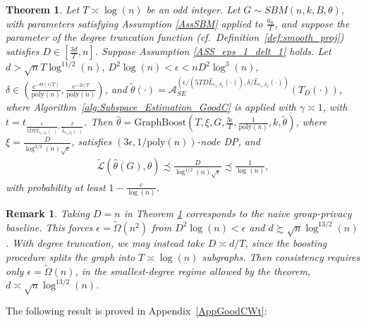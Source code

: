\documentclass{article}
\newtheorem{remark}{Remark}
\newtheorem{theorem}{Theorem}
\newcommand{\thetahat}{\ensuremath{\widehat{\theta}}}
\begin{document}
\begin{theorem}
\label{theorem:GoodCent_Main_Thm}
Let $T \asymp \log(n)$ be an odd integer. Let $G \sim SBM(n, k, B, \theta)$, with parameters satisfying Assumption \ref{AssSBM} applied to $\frac{a_n}{T}$, and suppose the parameter of the degree truncation function (cf.\ Definition~\ref{def:smooth_proj}) satisfies $D \in \left[\frac{3d}{T}, n\right]$. Suppose Assumption \ref{ASS_eps_1_delt_1} holds. Let $d > \sqrt{n}T\log^{11/2}(n)$, $D^2\log(n) < \epsilon < nD^2\log^3(n)$, $\delta \in \left(\frac{e^{-\Theta(\epsilon/T)}}{\mathrm{poly}(n)}, \frac{e^{-2\epsilon/T}}{\mathrm{poly}(n)}\right)$, and $\widetilde{\theta}(\cdot) = \mathcal{A}_{SE}^{\left(\epsilon/(5TD\hat{L}_{\epsilon_1, \delta_1}(\cdot)), \delta/\hat{L}_{\epsilon_1, \delta_1}(\cdot)\right)}(T_{D}(\cdot))$, where Algorithm~\ref{alg:Subspace_Estimation_GoodC} is applied with $\gamma \asymp 1$, with $t = t_{\frac{\epsilon}{5DT\hat{L}_{\epsilon_1, \delta_1}(\cdot)}, \frac{\delta}{\hat{L}_{\epsilon_1, \delta_1}(\cdot)}}$. Then $\thetahat = \mathrm{GraphBoost}\left(T, \xi, G, \frac{3\epsilon}{T}, \frac{1}{\mathrm{poly}(n)}, k, \widetilde{\theta}\right)$, where $\xi = \frac{D}{\log^{3/2}(n)\sqrt{\epsilon}}$, satisfies $(3\epsilon, 1/\mathrm{poly}(n))$-node DP, and
\begin{align*}
\widetilde{\mathcal{L}}\left(\thetahat(G), \theta\right) \precsim \frac{D}{\log^{1/2}(n)\sqrt{\epsilon}} \precsim \frac{1}{\log(n)},
\end{align*}
with probability at least $1 - \frac{c}{\log(n)}$.
\end{theorem}

\begin{remark}
\label{remark:SENW_D=n}
Taking $D=n$ in Theorem \ref{theorem:GoodCent_Main_Thm} corresponds to the naive group-privacy baseline. This forces $\epsilon = \widetilde{\Omega}(n^2)$ from $D^2\log(n)<\epsilon$ and $d \succsim \sqrt{n}\log^{13/2}(n)$. With degree truncation, we may instead take $D\asymp d/T$, since the boosting procedure splits the graph
into $T\asymp \log(n)$ subgraphs. Then consistency requires only $\epsilon=\widetilde{\Omega}(n)$, in the smallest-degree regime allowed by the theorem, $d \asymp \sqrt{n}\log^{13/2}(n)$.
\end{remark}

The following result is proved in Appendix~\ref{AppGoodCWt}:
\end{document}

